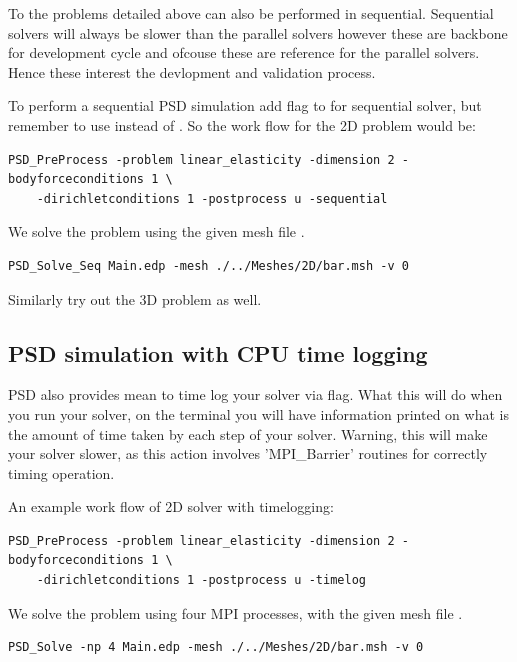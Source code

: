 To the problems detailed above can also be performed in sequential. Sequential solvers will always be slower than the parallel solvers however these are backbone for development cycle and ofcouse these are reference for the parallel solvers. Hence these interest the devlopment and validation process.

To perform a sequential PSD simulation add  flag to  for sequential solver, but remember to use  instead of . So the work flow for the 2D problem would be:

\begin{lstlisting}[style=BashInputStyle]
	PSD_PreProcess -problem linear_elasticity -dimension 2 -bodyforceconditions 1 \
	-dirichletconditions 1 -postprocess u -sequential
\end{lstlisting}

We solve the problem using the given mesh file . 

\begin{lstlisting}[style=BashInputStyle]
	PSD_Solve_Seq Main.edp -mesh ./../Meshes/2D/bar.msh -v 0
\end{lstlisting}

Similarly try out the 3D problem as well.

\subsection{PSD  simulation with CPU time logging \label{sec:cpu}}

PSD also provides mean to time log your solver via  flag. What this will do when you run your solver, on the terminal you will have information printed on what is the amount of time taken by each step of your solver. Warning, this will make your solver slower, as this action involves 'MPI\_Barrier' routines for correctly timing operation. 

An example work flow of 2D solver with timelogging:

\begin{lstlisting}[style=BashInputStyle]
	PSD_PreProcess -problem linear_elasticity -dimension 2 -bodyforceconditions 1 \
	-dirichletconditions 1 -postprocess u -timelog
\end{lstlisting}

We solve the problem using four MPI processes, with the given mesh file . 

\begin{lstlisting}[style=BashInputStyle]
	PSD_Solve -np 4 Main.edp -mesh ./../Meshes/2D/bar.msh -v 0
\end{lstlisting}



